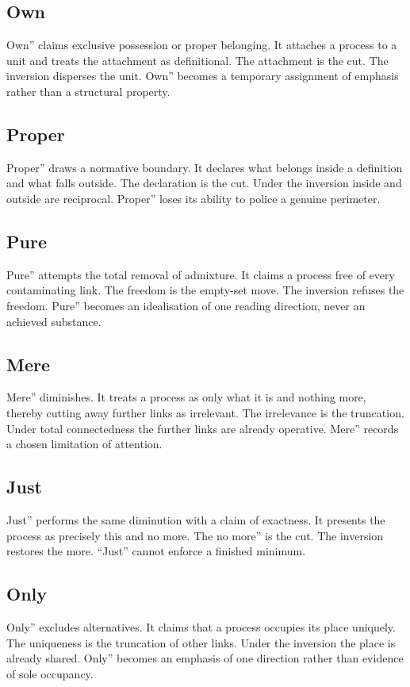 \documentclass[11pt,a4paper]{article}
\begin{document}
\subsection{Own} Own'' claims exclusive possession or proper belonging. It attaches a process to a unit and treats the attachment as definitional. The attachment is the cut. The inversion disperses the unit. Own'' becomes a temporary assignment of emphasis rather than a structural property.

\subsection{Proper} Proper'' draws a normative boundary. It declares what belongs inside a definition and what falls outside. The declaration is the cut. Under the inversion inside and outside are reciprocal. Proper'' loses its ability to police a genuine perimeter.

\subsection{Pure} Pure'' attempts the total removal of admixture. It claims a process free of every contaminating link. The freedom is the empty-set move. The inversion refuses the freedom. Pure'' becomes an idealisation of one reading direction, never an achieved substance.

\subsection{Mere} Mere'' diminishes. It treats a process as only what it is and nothing more, thereby cutting away further links as irrelevant. The irrelevance is the truncation. Under total connectedness the further links are already operative. Mere'' records a chosen limitation of attention.

\subsection{Just} Just'' performs the same diminution with a claim of exactness. It presents the process as precisely this and no more. The no more'' is the cut. The inversion restores the more. ``Just'' cannot enforce a finished minimum.

\subsection{Only} Only'' excludes alternatives. It claims that a process occupies its place uniquely. The uniqueness is the truncation of other links. Under the inversion the place is already shared. Only'' becomes an emphasis of one direction rather than evidence of sole occupancy.
\end{document}
